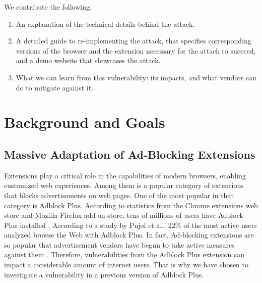 \documentclass[conference]{IEEEtran}
\begin{document}
We contribute the following:
\begin{enumerate}
    \item An explanation of the technical details behind the attack.
    \item A detailed guide to re-implementing the attack, that specifies corresponding versions of the browser and the extension necessary for the attack to succeed, and a demo website that showcases the attack.
    \item What we can learn from this vulnerability: its impacts, and what vendors can do to mitigate against it.
\end{enumerate}

\section{Background and Goals}
\subsection{Massive Adaptation of Ad-Blocking Extensions}
Extensions play a critical role in the capabilities of modern browsers, enabling customized web experiences. Among them is a popular category of extensions that blocks advertisements on web pages. One of the most popular in that category is Adblock Plus. According to statistics from the Chrome extensions web store and Mozilla Firefox add-on store, tens of millions of users have Adblock Plus installed \cite{noauthor_adblockchrome_nodate, noauthor_adblockfirefox_nodate}. According to a study by Pujol et al., 22\% of the most active users analyzed browse the Web with Adblock Plus. In fact, Ad-blocking extensions are so popular that advertisement vendors have begun to take active measures against them \cite{mughees_first_2016}. Therefore, vulnerabilities from the Adblock Plus extension can impact a considerable amount of internet users. That is why we have chosen to investigate a vulnerability in a previous version of Adblock Plus.
\end{document}
